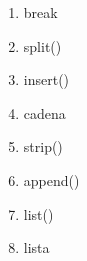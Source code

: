
\begin{multicols}{4}
  \begin{enumerate}
    \item break
    \item split()
    \item insert()
    \item cadena
    \item strip()
    \item append()
    \item list()
    \item lista
  \end{enumerate}
\end{multicols}
